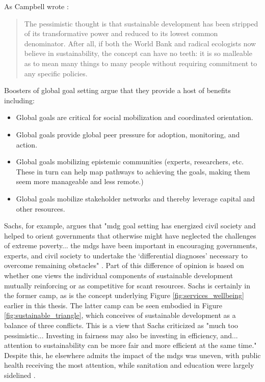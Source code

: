 As Campbell wrote \cite{campbellGreenCitiesGrowing2016}:

\blockquote{The pessimistic thought is that sustainable development has been stripped of its transformative power and reduced to its lowest common denominator. After all, if both the World Bank and radical ecologists now believe in sustainability, the concept can have no teeth: it is so malleable as to mean many things to many people without requiring commitment to any specific policies.}

Boosters of global goal setting argue that they provide a host of benefits including: 

\begin{itemize} \setlength{\itemsep}{0pt} \setlength{\parskip}{0pt}%
	\item{Global goals are critical for social mobilization and coordinated orientation.}
	\item{Global goals provide global peer pressure for adoption, monitoring, and action.}
	\item{Global goals mobilizing epistemic communities (experts, researchers, etc. These in turn can help map pathways to achieving the goals, making them seem more manageable and less remote.)}
	\item{Global goals mobilize stakeholder networks and thereby leverage capital and other resources.}
\end{itemize}

Sachs, for example, argues that "\ac{mdg} goal setting has energized civil society and helped to orient governments that otherwise might have neglected the challenges of extreme poverty... the \acp{mdg} have been important in encouraging governments, experts, and civil society to undertake the `differential diagnoses' necessary to overcome remaining obstacles" \cite{sachsAgeSustainableDevelopment2015}. Part of this difference of opinion is based on whether one views the individual components of sustainable development mutually reinforcing or as competitive for scant resources. Sachs is certainly in the former camp, as is the concept underlying Figure \ref{fig:services_wellbeing} earlier in this thesis. The latter camp can be seen embodied in Figure \ref{fig:sustainable_triangle}, which conceives of sustainable development as a balance of three conflicts. This is a view that Sachs criticized as "much too pessimistic... Investing in fairness may also be investing in efficiency, and... attention to sustainability can be more fair and more efficient at the same time." Despite this, he elsewhere admits the impact of the \acp{mdg} was uneven, with public health receiving the most attention, while sanitation and education were largely sidelined \cite{sachsAgeSustainableDevelopment2015}.


